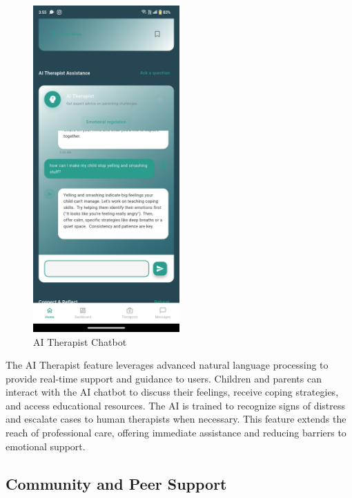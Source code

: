 ﻿\documentclass[12pt,a4paper]{article}
\newcommand{\sectiontitle}[1]{\subsection{#1}}
\begin{document}
\begin{figure}[H]
    \centering
    \includegraphics[width=0.5\textwidth]{Screenshots/aitherapist.png}
    \caption{AI Therapist Chatbot}
    \label{fig:ai-therapist}
\end{figure}
The AI Therapist feature leverages advanced natural language processing to provide real-time support and guidance to users. Children and parents can interact with the AI chatbot to discuss their feelings, receive coping strategies, and access educational resources. The AI is trained to recognize signs of distress and escalate cases to human therapists when necessary. This feature extends the reach of professional care, offering immediate assistance and reducing barriers to emotional support.

\sectiontitle{Community and Peer Support}
\end{document}
